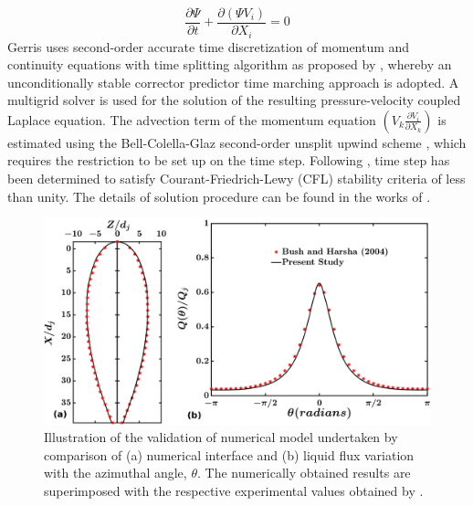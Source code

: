 \documentclass[%
 aip,
 sd,%
amsmath,amssymb,
preprint,%
author-year,%
]{revtex4-1}
\begin{document}
\begin{equation} \label{Equation::vof}
\frac{\partial \Psi}{\partial t} + \frac{\partial(\Psi V_i)}{\partial X_i} = 0
\end{equation}
Gerris uses second-order accurate time discretization of momentum and continuity equations with time splitting algorithm as proposed by \cite{Chorin1968}, whereby an unconditionally stable corrector predictor time marching approach is adopted. A multigrid solver is used for the solution of the resulting pressure-velocity coupled Laplace equation. The advection term of the momentum equation $\left(V_k\frac{\partial V_i}{\partial X_k}\right)$ is estimated using the Bell-Colella-Glaz second-order unsplit upwind scheme \citep{bell1989second}, which requires the restriction to be set up on the time step. Following \cite{popinet2009}, time step has been determined to satisfy Courant-Friedrich-Lewy (CFL) stability criteria of less than unity. The details of solution procedure can be found in the works of \cite{Popinet2003,popinet2009}.\\
\begin{figure}
	\centering
	\includegraphics[width=\linewidth]{Figure3}
	\caption{Illustration of the validation of numerical model undertaken by comparison of (a) numerical interface and (b) liquid flux variation with the azimuthal angle, $\theta$. The numerically obtained results are superimposed with the respective experimental values obtained by \cite{bush2004collision}.}
	\label{Figure::validation}
\end{figure}
\end{document}
